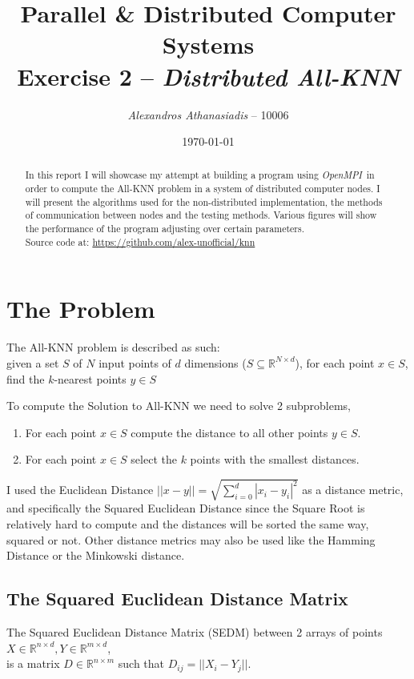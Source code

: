 \documentclass[10pt, a4paper]{article}
\newcommand{\mpi}{\textit{OpenMPI}}
\begin{document}
\title{
	\textbf{Parallel \& Distributed Computer Systems}\\
	Exercise 2 -- \textit{Distributed All-KNN}
}

\author{\textit{Alexandros Athanasiadis} -- 10006}
\date{\today}

\maketitle

\begin{abstract}
	In this report I will showcase my attempt at building a program using \mpi \ in order
	to compute the All-KNN problem in a system of distributed computer nodes. I will present the
	algorithms used for the non-distributed implementation, the methods of communication between nodes 
	and the testing methods. Various figures will show the performance of the program adjusting over
	certain parameters. \\

	\noindent
	Source code at: \url{https://github.com/alex-unofficial/knn}
\end{abstract}

\section{The Problem}
The All-KNN problem is described as such: \\
given a set $S$ of $N$ input points of $d$ dimensions ($S \subseteq \mathbb{R}^{N \times d}$),
for each point $x \in S$, find the $k$-nearest points $y \in S$

To compute the Solution to All-KNN we need to solve 2 subproblems, 
\begin{enumerate}
	\item For each point $x \in S$ compute the distance to all other points $y \in S$.
	\item For each point $x \in S$ select the $k$ points with the smallest distances.
\end{enumerate}

I used the Euclidean Distance $||x - y|| = \sqrt{\sum_{i=0}^d |x_i - y_i|^2}$ 
as a distance metric, and specifically the Squared Euclidean Distance since the Square Root is 
relatively hard to compute and the distances will be sorted the same way, squared or not. 
Other distance metrics may also be used like the Hamming Distance or the Minkowski distance.

\subsection{The Squared Euclidean Distance Matrix}
The Squared Euclidean Distance Matrix (SEDM) between 2 arrays of points 
$X \in \mathbb{R}^{n \times d}, Y \in \mathbb{R}^{m \times d}$, \\
is a matrix $D \in \mathbb{R}^{n \times m}$ such that $D_{ij} = ||X_i - Y_j||$.
\end{document}
